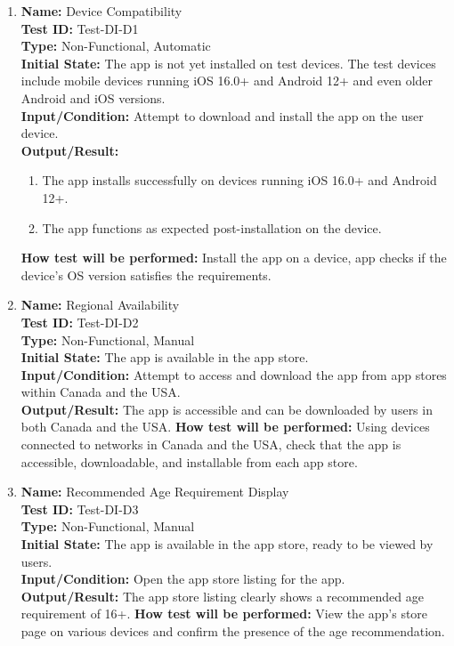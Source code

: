 \documentclass[12pt, titlepage]{article}
\begin{document}
\begin{enumerate}

  \item \textbf{Name:} Device Compatibility \label{itm:Test-DI-D1} \\
        \textbf{Test ID:} Test-DI-D1 \\
        \textbf{Type:} Non-Functional, Automatic \\
        \textbf{Initial State:} The app is not yet installed on test devices. The test devices include mobile devices running iOS 16.0+ and Android 12+ and even older Android and iOS versions. \\
        \textbf{Input/Condition:} Attempt to download and install the app on the user device. \\
        \textbf{Output/Result:}
        \begin{enumerate}
          \item The app installs successfully on devices running iOS 16.0+ and Android 12+.
          \item The app functions as expected post-installation on the device.
        \end{enumerate}
        \textbf{How test will be performed:} Install the app on a device, app checks if the device's OS version satisfies the requirements. \\

  \item \textbf{Name:} Regional Availability \label{itm:Test-DI-D2} \\
        \textbf{Test ID:} Test-DI-D2 \\
        \textbf{Type:} Non-Functional, Manual \\
        \textbf{Initial State:} The app is available in the app store. \\
        \textbf{Input/Condition:} Attempt to access and download the app from app stores within Canada and the USA. \\
        \textbf{Output/Result:} The app is accessible and can be downloaded by users in both Canada and the USA.
        \textbf{How test will be performed:} Using devices connected to networks in Canada and the USA, check that the app is accessible, downloadable, and installable from each app store. \\

  \item \textbf{Name:} Recommended Age Requirement Display \label{itm:Test-DI-D3} \\
        \textbf{Test ID:} Test-DI-D3 \\
        \textbf{Type:} Non-Functional, Manual \\
        \textbf{Initial State:} The app is available in the app store, ready to be viewed by users. \\
        \textbf{Input/Condition:} Open the app store listing for the app. \\
        \textbf{Output/Result:} The app store listing clearly shows a recommended age requirement of 16+.
        \textbf{How test will be performed:} View the app's store page on various devices and confirm the presence of the age recommendation. \\


\end{enumerate}
\end{document}
